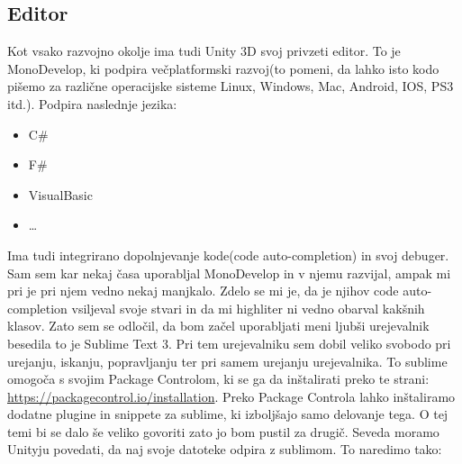 {\color{indiagreen}\subsection{Editor}}
Kot vsako razvojno okolje ima tudi Unity 3D svoj privzeti editor. To je MonoDevelop, ki podpira večplatformski razvoj(to pomeni, da lahko isto kodo pišemo za različne operacijske sisteme Linux, Windows, Mac, Android, IOS, PS3 itd.). Podpira naslednje jezika: \\
\begin{itemize}
	\item C\#
	\item F\#
	\item VisualBasic
	\item \dots
\end{itemize}
Ima tudi integrirano dopolnjevanje kode(code auto-completion) in svoj debuger. Sam sem kar nekaj časa uporabljal MonoDevelop in v njemu razvijal, ampak mi pri je pri njem vedno nekaj manjkalo. Zdelo se mi je, da je njihov code auto-completion vsiljeval svoje stvari in da mi highliter ni vedno obarval kakšnih klasov. Zato sem se odločil, da bom začel uporabljati meni ljubši urejevalnik besedila to je Sublime Text 3. Pri tem urejevalniku sem dobil veliko svobodo pri urejanju, iskanju, popravljanju ter pri samem urejanju urejevalnika. To sublime omogoča s svojim Package Controlom, ki se ga da inštalirati preko te strani: \url{https://packagecontrol.io/installation}. Preko Package Controla lahko inštaliramo dodatne plugine in snippete za sublime, ki izboljšajo samo delovanje tega. O tej temi bi se dalo še veliko govoriti zato jo bom pustil za drugič. Seveda moramo Unityju povedati, da naj svoje datoteke odpira z sublimom. To naredimo tako:\\
